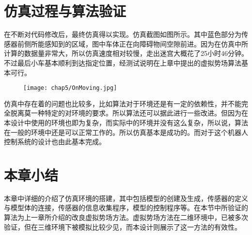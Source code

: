 \section{仿真过程与算法验证}
在不断对代码修改后，最终仿真得以实现。仿真截图如图所示。其中蓝色部分为传感器前侧所能感知到的区域，图中车体正在向障碍物间空隙前进。因为在仿真中所计算的数据量非常大，所以仿真速度相对较慢，走出迷宫大概花了25小时46分钟。不过最后小车基本顺利到达指定位置，经测试说明在上章中提出的虚拟势场算法基本可行。
\begin{figure}[!htp]
  \centering
  \texttt{[image: chap5/OnMoving.jpg]}
\end{figure}

仿真中存在着的问题也比较多，比如算法对于环境还是有一定的依赖性，并不能完全脱离莫一种特定的对环境的要求。所以算法还可以据此进行一些改进。但因为在本设计中使用的环境也即为复杂，而实际中的环境并没有这么复杂，所以说，算法在一般的环境中还是可以正常工作的。所以仿真基本是成功的。而对于这个机器人控制系统的设计也由此基本完成。
\section{本章小结}
本章中详细的介绍了仿真环境的搭建，其中包括模型的创建及生成，传感器的定义与模型体的连接，传感器的信息收集程序，模型的控制程序等。在本节中所验证的算法为上一章所介绍的改良虚拟势场方法。虚拟势场方法在二维环境中，已被多次验证，但在三维环境下被模拟比较少见，而本设计则展示了这一方法的有效性。
